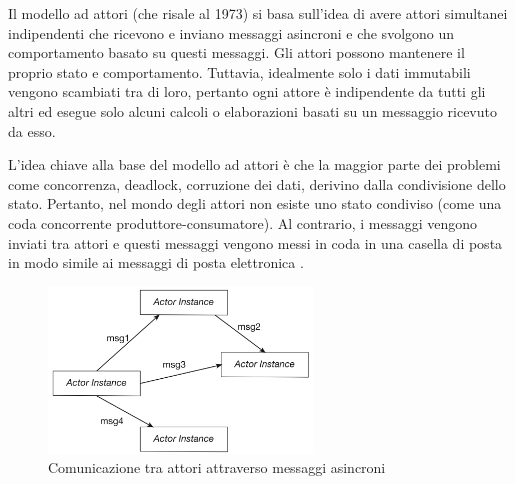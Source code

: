 \medskip

Il modello ad attori (che risale al 1973) si basa sull'idea di avere attori simultanei indipendenti che ricevono e inviano messaggi asincroni e che svolgono un comportamento basato su questi messaggi. Gli attori possono mantenere il proprio stato e comportamento. Tuttavia, idealmente solo i dati immutabili vengono scambiati tra di loro, pertanto ogni attore è indipendente da tutti gli altri ed esegue solo alcuni calcoli o elaborazioni basati su un messaggio ricevuto da esso.

\medskip

L'idea chiave alla base del modello ad attori è che la maggior parte dei problemi come concorrenza, deadlock, corruzione dei dati, derivino dalla condivisione dello stato. Pertanto, nel mondo degli attori non esiste uno stato condiviso (come una coda concorrente produttore-consumatore). Al contrario, i messaggi vengono inviati tra attori e questi messaggi vengono messi in coda in una casella di posta in modo simile ai messaggi di posta elettronica \cite{play_framework_book}.

\begin{figure}[H]
\centering
\includegraphics[width=7cm]{figures/Actors_communicating.png}
\caption{Comunicazione tra attori attraverso messaggi asincroni \cite{akka}}
\end{figure}
